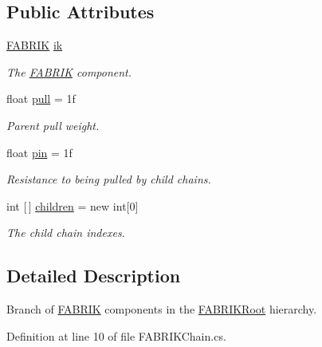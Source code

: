 \subsection*{Public Attributes}
\begin{DoxyCompactItemize}
\item 
\mbox{\hyperlink{class_root_motion_1_1_final_i_k_1_1_f_a_b_r_i_k}{F\+A\+B\+R\+IK}} \mbox{\hyperlink{class_root_motion_1_1_final_i_k_1_1_f_a_b_r_i_k_chain_ac5e83eed28e82ec0d6725f8368fbb993}{ik}}
\begin{DoxyCompactList}\small\item\em The \mbox{\hyperlink{class_root_motion_1_1_final_i_k_1_1_f_a_b_r_i_k}{F\+A\+B\+R\+IK}} component. \end{DoxyCompactList}\item 
float \mbox{\hyperlink{class_root_motion_1_1_final_i_k_1_1_f_a_b_r_i_k_chain_a1c40f2fd2938f09b553e41bde28fbc13}{pull}} = 1f
\begin{DoxyCompactList}\small\item\em Parent pull weight. \end{DoxyCompactList}\item 
float \mbox{\hyperlink{class_root_motion_1_1_final_i_k_1_1_f_a_b_r_i_k_chain_a2e600dc5e25f1f1f5d25b1a356c8143f}{pin}} = 1f
\begin{DoxyCompactList}\small\item\em Resistance to being pulled by child chains. \end{DoxyCompactList}\item 
int \mbox{[}$\,$\mbox{]} \mbox{\hyperlink{class_root_motion_1_1_final_i_k_1_1_f_a_b_r_i_k_chain_ab62f55c4a3bf79ce8b76cda3c5f358a5}{children}} = new int\mbox{[}0\mbox{]}
\begin{DoxyCompactList}\small\item\em The child chain indexes. \end{DoxyCompactList}\end{DoxyCompactItemize}


\subsection{Detailed Description}
Branch of \mbox{\hyperlink{class_root_motion_1_1_final_i_k_1_1_f_a_b_r_i_k}{F\+A\+B\+R\+IK}} components in the \mbox{\hyperlink{class_root_motion_1_1_final_i_k_1_1_f_a_b_r_i_k_root}{F\+A\+B\+R\+I\+K\+Root}} hierarchy. 



Definition at line 10 of file F\+A\+B\+R\+I\+K\+Chain.\+cs.



